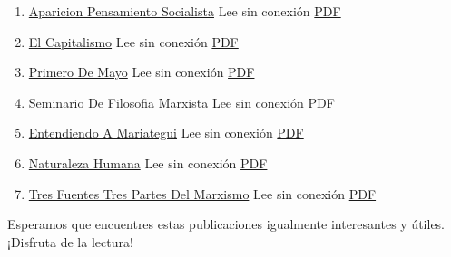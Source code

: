 \documentclass[
  jou,
  floatsintext,
  longtable,
  a4paper,
  nolmodern,
  notxfonts,
  notimes,
  colorlinks=true,linkcolor=blue,citecolor=blue,urlcolor=blue]{apa7}
\providecommand{\tightlist}{%
  \setlength{\itemsep}{0pt}\setlength{\parskip}{0pt}}
\begin{document}
\begin{enumerate}
\def\labelenumi{\arabic{enumi}.}
\tightlist
\item
  \href{https://achalmaedison.netlify.app/filosofia-politica/posts/2018-04-23-aparicion-pensamiento-socialista}{Aparicion
  Pensamiento Socialista} Lee sin conexión
  \href{https://achalmaedison.netlify.app/filosofia-politica/posts/2018-04-23-aparicion-pensamiento-socialista/index.pdf}{PDF}
\item
  \href{https://achalmaedison.netlify.app/filosofia-politica/posts/2023-03-03-el-capitalismo}{El
  Capitalismo} Lee sin conexión
  \href{https://achalmaedison.netlify.app/filosofia-politica/posts/2023-03-03-el-capitalismo/index.pdf}{PDF}
\item
  \href{https://achalmaedison.netlify.app/filosofia-politica/posts/2023-04-29-primero-de-mayo}{Primero
  De Mayo} Lee sin conexión
  \href{https://achalmaedison.netlify.app/filosofia-politica/posts/2023-04-29-primero-de-mayo/index.pdf}{PDF}
\item
  \href{https://achalmaedison.netlify.app/filosofia-politica/posts/2023-05-19-seminario-de-filosofia-marxista}{Seminario
  De Filosofia Marxista} Lee sin conexión
  \href{https://achalmaedison.netlify.app/filosofia-politica/posts/2023-05-19-seminario-de-filosofia-marxista/index.pdf}{PDF}
\item
  \href{https://achalmaedison.netlify.app/filosofia-politica/posts/2023-06-09-entendiendo-a-mariategui}{Entendiendo
  A Mariategui} Lee sin conexión
  \href{https://achalmaedison.netlify.app/filosofia-politica/posts/2023-06-09-entendiendo-a-mariategui/index.pdf}{PDF}
\item
  \href{https://achalmaedison.netlify.app/filosofia-politica/posts/2023-06-09-naturaleza-humana}{Naturaleza
  Humana} Lee sin conexión
  \href{https://achalmaedison.netlify.app/filosofia-politica/posts/2023-06-09-naturaleza-humana/index.pdf}{PDF}
\item
  \href{https://achalmaedison.netlify.app/filosofia-politica/posts/2023-10-23-tres-fuentes-tres-partes-del-marxismo}{Tres
  Fuentes Tres Partes Del Marxismo} Lee sin conexión
  \href{https://achalmaedison.netlify.app/filosofia-politica/posts/2023-10-23-tres-fuentes-tres-partes-del-marxismo/index.pdf}{PDF}
\end{enumerate}

Esperamos que encuentres estas publicaciones igualmente interesantes y
útiles. ¡Disfruta de la lectura!
\end{document}
